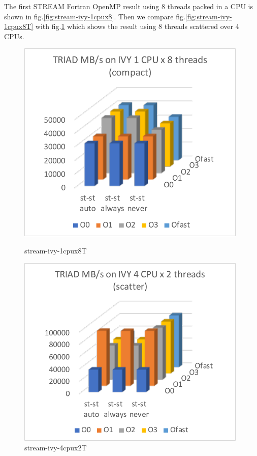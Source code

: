 \documentclass[conference]{IEEEtran}
\begin{document}
The first STREAM Fortran OpenMP result using 8 threads packed in a CPU
is shown in fig.\ref{fig:stream-ivy-1cpux8}.
Then we compare fig.\ref{fig:stream-ivy-1cpux8T}
with
fig.\ref{fig:stream-ivy-4cpux2T} 
which shows the result using 8 threads scattered over 4 CPUs.
%
%
\begin{figure}[tb]
\begin{minipage}{0.48\hsize}
\includegraphics[width=0.98\textwidth]{figs/stream-ivy-1cpux8T.pdf}
\caption{stream-ivy-1cpux8T}
\label{fig:stream-ivy-1cpux8T}
\end{minipage}
\begin{minipage}{0.48\hsize}
\includegraphics[width=0.98\textwidth]{figs/stream-ivy-4cpux2T.pdf}
\caption{stream-ivy-4cpux2T}
\label{fig:stream-ivy-4cpux2T}
\end{minipage}
\end{figure}
\end{document}
